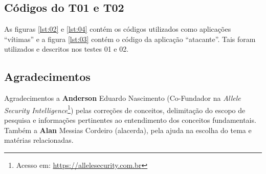 \documentclass[
	article,			    %
	12pt,				    %
	oneside,			    %
	a4paper,			    %
	chapter=TITLE,		    %
	section=TITLE,		    %
	subsection=TITLE,	    %
	english,			    %
	brazil,				    %
	sumario=tradicional
]{abntex2}
\begin{document}
\postextual

\begin{apendicesenv}
\chapter{Códigos do T01 e T02}
\label{appendix:a}
As figuras \ref{lst:02} e \ref{lst:04} contém os códigos utilizados como aplicações ``vítimas'' e a figura \ref{lst:03} contém o código da aplicação ``atacante''. Tais foram utilizados e descritos nos testes 01 e 02.



\end{apendicesenv}
\begin{anexosenv}
\vspace{\onelineskip}
\end{anexosenv}
\section*{Agradecimentos}
Agradecimentos a \textbf{Anderson} Eduardo Nascimento (Co-Fundador na \emph{Allele Security Intelligence}\footnote{Acesso em: \url{https://allelesecurity.com.br}}) pelas correções de conceitos, delimitação do escopo de pesquisa e informações pertinentes ao entendimento dos conceitos fundamentais. Também a \textbf{Alan} Messias Cordeiro (alacerda), pela ajuda na escolha do tema e matérias relacionadas.
\end{document}
